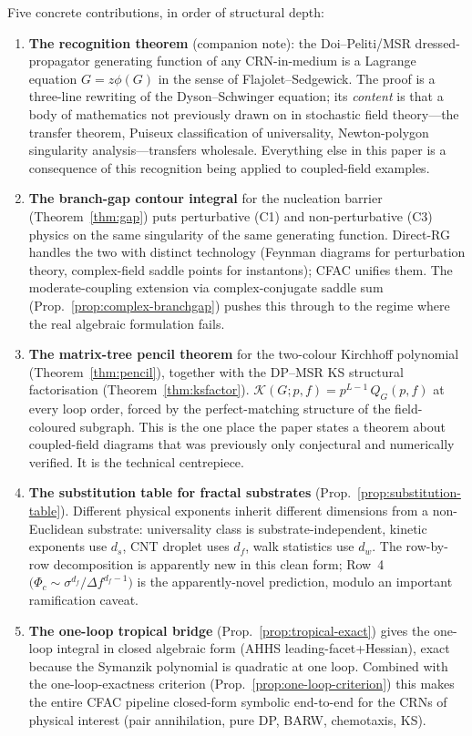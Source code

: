 \documentclass[11pt,a4paper]{article}
\theoremstyle{plain}
\begin{document}
Five concrete contributions, in order of structural depth:
\begin{enumerate}[leftmargin=1.8em,itemsep=0.15em]
\item \textbf{The recognition theorem} (companion note): the
  Doi--Peliti/MSR dressed-propagator generating function of any
  CRN-in-medium is a Lagrange equation $G = z \phi(G)$ in the
  sense of Flajolet--Sedgewick.  The proof is a three-line
  rewriting of the Dyson--Schwinger equation; its \emph{content}
  is that a body of mathematics not previously drawn on in
  stochastic field theory---the transfer theorem, Puiseux
  classification of universality, Newton-polygon singularity
  analysis---transfers wholesale.  Everything else in this paper
  is a consequence of this recognition being applied to
  coupled-field examples.
\item \textbf{The branch-gap contour integral} for the
  nucleation barrier (Theorem~\ref{thm:gap}) puts perturbative
  (C1) and non-perturbative (C3) physics on the same
  singularity of the same generating function.  Direct-RG
  handles the two with distinct technology (Feynman diagrams for
  perturbation theory, complex-field saddle points for
  instantons); CFAC unifies them.  The moderate-coupling
  extension via complex-conjugate saddle sum
  (Prop.~\ref{prop:complex-branchgap}) pushes this through to
  the regime where the real algebraic formulation fails.
\item \textbf{The matrix-tree pencil theorem} for the two-colour
  Kirchhoff polynomial (Theorem~\ref{thm:pencil}), together with
  the DP--MSR KS structural factorisation
  (Theorem~\ref{thm:ksfactor}).  $\mathcal{K}(G; p, f) =
  p^{L-1}\,Q_G(p, f)$ at every loop order, forced by the
  perfect-matching structure of the field-coloured subgraph.
  This is the one place the paper states a theorem about
  coupled-field diagrams that was previously only conjectural and
  numerically verified.  It is the technical centrepiece.
\item \textbf{The substitution table for fractal substrates}
  (Prop.~\ref{prop:substitution-table}).  Different physical
  exponents inherit different dimensions from a non-Euclidean
  substrate: universality class is substrate-independent,
  kinetic exponents use $d_s$, CNT droplet uses $d_f$, walk
  statistics use $d_w$.  The row-by-row decomposition is
  apparently new in this clean form; Row~4
  $\bigl(\Phi_c \sim \sigma^{d_f}/\Delta f^{d_f - 1}\bigr)$ is
  the apparently-novel prediction, modulo an important
  ramification caveat.
\item \textbf{The one-loop tropical bridge}
  (Prop.~\ref{prop:tropical-exact}) gives the one-loop integral
  in closed algebraic form (AHHS leading-facet+Hessian), exact
  because the Symanzik polynomial is quadratic at one loop.
  Combined with the one-loop-exactness criterion
  (Prop.~\ref{prop:one-loop-criterion}) this makes the entire
  CFAC pipeline closed-form symbolic end-to-end for the CRNs of
  physical interest (pair annihilation, pure DP, BARW,
  chemotaxis, KS).
\end{enumerate}
\end{document}
